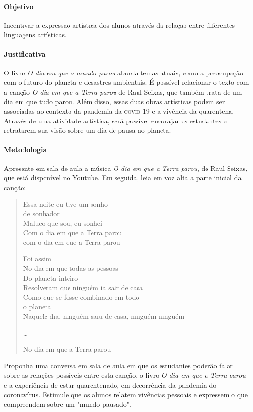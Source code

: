 \documentclass[11pt]{extarticle}
\begin{document}
\paragraph{Objetivo} Incentivar a expressão artística dos alunos através da relação entre diferentes linguagens artísticas.

\paragraph{Justificativa} O livro \textit{O dia em que o mundo parou} aborda temas atuais, como a preocupação com o futuro do planeta e desastres ambientais. É possível relacionar o texto com a canção \textit{O dia em que a Terra parou} de Raul Seixas, que também trata de um dia em que tudo parou. Além disso, essas duas obras artísticas podem ser associadas ao contexto da pandemia da \textsc{covid}-19 e a vivência da quarentena. Através de uma atividade artística, será possível encorajar os estudantes a retratarem sua visão sobre um dia de pausa no planeta.

\paragraph{Metodologia} Apresente em sala de aula a música \textit{O dia em que a Terra parou}, de Raul Seixas, que está disponível no \href{https://youtu.be/SqQfySakoK0}{Youtube}. Em seguida, leia em voz alta a parte inicial da canção:

\begin{verse}
Essa noite eu tive um sonho\\
de sonhador\\
Maluco que sou, eu sonhei\\
Com o dia em que a Terra parou\\
com o dia em que a Terra parou

Foi assim\\
No dia em que todas as pessoas\\
Do planeta inteiro\\
Resolveram que ninguém ia sair de casa\\
Como que se fosse combinado em todo\\
o planeta\\
Naquele dia, ninguém saiu de casa, ninguém ninguém

\ldots

No dia em que a Terra parou
\end{verse}

Proponha uma conversa em sala de aula em que os estudantes poderão falar sobre as relações possíveis entre esta canção, o livro \textit{O dia em que a Terra parou} e a experiência de estar quarentenado, em decorrência da pandemia do coronavírus. Estimule que os alunos relatem vivências pessoais e expressem o que compreendem sobre um "mundo pausado".
\end{document}
